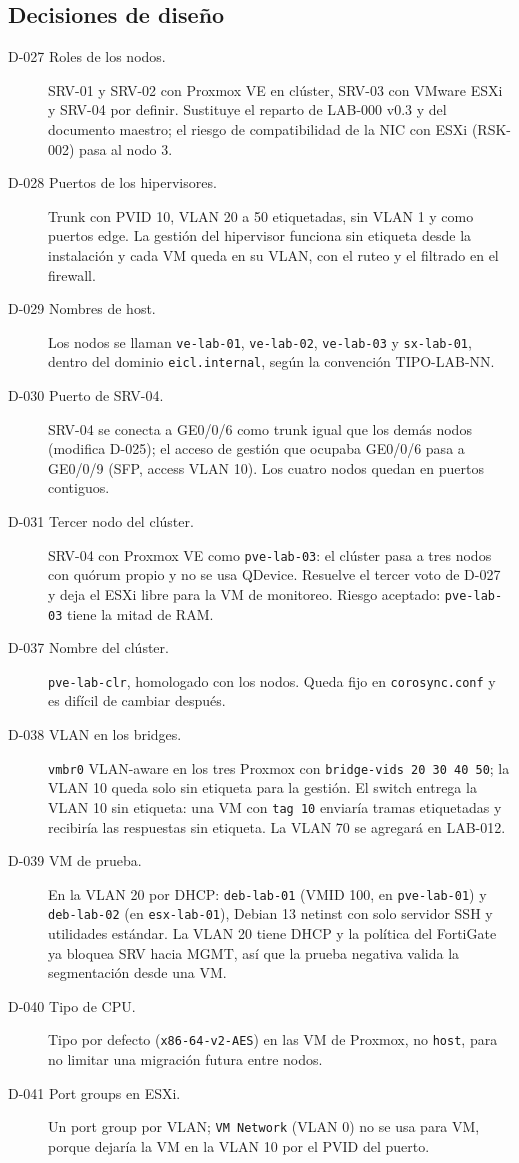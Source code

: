 \documentclass[11pt,a4paper]{article}
\newcommand{\fn}[1]{\texttt{\fnbreaks#1\fnend}}
\def\fnbreaks#1\fnend{\begingroup\fnactive\scantokens{#1\noexpand}\endgroup}
\gdef\fnactive{\catcode`\-=\active\catcode`\/=\active
  \def-{\char`\-\allowbreak}\def/{\char`\/\allowbreak}\let\_\fnus}
\newcommand{\fnus}{\textunderscore\allowbreak}
\begin{document}
\subsection{Decisiones de diseño}
\begin{description}
  \item[D-027 Roles de los nodos.] SRV-01 y SRV-02 con Proxmox VE en clúster, SRV-03 con VMware ESXi y SRV-04 por definir. Sustituye el reparto de LAB-000 v0.3 y del documento maestro; el riesgo de compatibilidad de la NIC con ESXi (RSK-002) pasa al nodo 3.
  \item[D-028 Puertos de los hipervisores.] Trunk con PVID 10, VLAN 20 a 50 etiquetadas, sin VLAN 1 y como puertos edge. La gestión del hipervisor funciona sin etiqueta desde la instalación y cada VM queda en su VLAN, con el ruteo y el filtrado en el firewall.
  \item[D-029 Nombres de host.] Los nodos se llaman \fn{pve-lab-01}, \fn{pve-lab-02}, \fn{pve-lab-03} y \fn{esx-lab-01}, dentro del dominio \texttt{eicl.internal}, según la convención TIPO-LAB-NN.
  \item[D-030 Puerto de SRV-04.] SRV-04 se conecta a GE0/0/6 como trunk igual que los demás nodos (modifica D-025); el acceso de gestión que ocupaba GE0/0/6 pasa a GE0/0/9 (SFP, access VLAN 10). Los cuatro nodos quedan en puertos contiguos.
  \item[D-031 Tercer nodo del clúster.] SRV-04 con Proxmox VE como \texttt{pve-lab-03}: el clúster pasa a tres nodos con quórum propio y no se usa QDevice. Resuelve el tercer voto de D-027 y deja el ESXi libre para la VM de monitoreo. Riesgo aceptado: \texttt{pve-lab-03} tiene la mitad de RAM.
  \item[D-037 Nombre del clúster.] \texttt{pve-lab-clr}, homologado con los nodos. Queda fijo en \texttt{corosync.conf} y es difícil de cambiar después.
  \item[D-038 VLAN en los bridges.] \texttt{vmbr0} VLAN-aware en los tres Proxmox con \texttt{bridge-vids 20 30 40 50}; la VLAN 10 queda solo sin etiqueta para la gestión. El switch entrega la VLAN 10 sin etiqueta: una VM con \texttt{tag 10} enviaría tramas etiquetadas y recibiría las respuestas sin etiqueta. La VLAN 70 se agregará en LAB-012.
  \item[D-039 VM de prueba.] En la VLAN 20 por DHCP: \texttt{deb-lab-01} (VMID 100, en \texttt{pve-lab-01}) y \texttt{deb-lab-02} (en \texttt{esx-lab-01}), Debian 13 netinst con solo servidor SSH y utilidades estándar. La VLAN 20 tiene DHCP y la política del FortiGate ya bloquea SRV hacia MGMT, así que la prueba negativa valida la segmentación desde una VM.
  \item[D-040 Tipo de CPU.] Tipo por defecto (\texttt{x86-64-v2-AES}) en las VM de Proxmox, no \texttt{host}, para no limitar una migración futura entre nodos.
  \item[D-041 Port groups en ESXi.] Un port group por VLAN; \texttt{VM Network} (VLAN 0) no se usa para VM, porque dejaría la VM en la VLAN 10 por el PVID del puerto.
\end{description}
\end{document}

